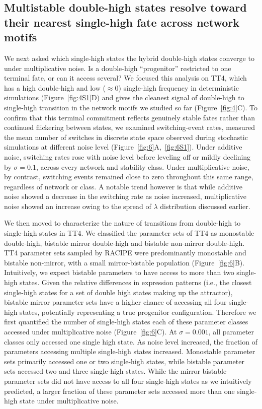 \documentclass[11pt]{article}
\begin{document}
\subsection{Multistable double-high states resolve toward their nearest single-high fate across network motifs}
We next asked which single-high states the hybrid double-high states converge to under multiplicative noise. Is a double-high ``progenitor'' restricted to one terminal fate, or can it access several? We focused this analysis on TT4, which has a high double-high and low ($\approx 0$) single-high frequency in deterministic simulations (Figure~\ref{fig:4S1}D) and gives the cleanest signal of double-high to single-high transition in the network motifs we studied so far (Figure~\ref{fig:4}C). To confirm that this terminal commitment reflects genuinely stable fates rather than continued flickering between states, we examined switching-event rates, measured the mean number of switches in discrete state space observed during stochastic simulations at different noise level (Figure~\ref{fig:6}A,~\ref{fig:6S1}). Under additive noise, switching rates rose with noise level before leveling off or mildly declining by $\sigma=0.1$, across every network and stability class. Under multiplicative noise, by contrast, switching events remained close to zero throughout this same range, regardless of network or class. A notable trend however is that while additive noise showed a decrease in the switching rate as noise increased, multiplicative noise showed an increase owing to the spread of $\lambda$ distribution discussed earlier. 

We then moved to characterize the nature of transitions from double-high to single-high states in TT4. We classified the parameter sets of TT4 as monostable double-high, bistable mirror double-high and bistable non-mirror double-high. TT4 parameter sets sampled by RACIPE were predominantly monostable and bistable non-mirror, with a small mirror-bistable population (Figure~\ref{fig:6}B).  Intuitively, we expect bistable parameters to have access to more than two single-high states. Given the relative differences in expression patterns (i.e., the closest single-high states for a set of double high states making up the attractor), bistable mirror parameter sets have a higher chance of accessing all four single-high states, potentially representing a true progenitor configuration. Therefore we first quantified the number of single-high states each of these parameter classes accessed under multiplicative noise (Figure~\ref{fig:6}C). At $\sigma = 0.001$, all parameter classes only accessed one single high state. As noise level increased, the fraction of parameters accessing multiple single-high states increased. Monostable parameter sets primarily accessed one or two single-high states, while bistable parameter sets accessed two and three single-high states. While the mirror bistable parameter sets did not have access to all four single-high states as we intuitively predicted, a larger fraction of these parameter sets accessed more than one single-high state under multiplicative noise.  
\end{document}

